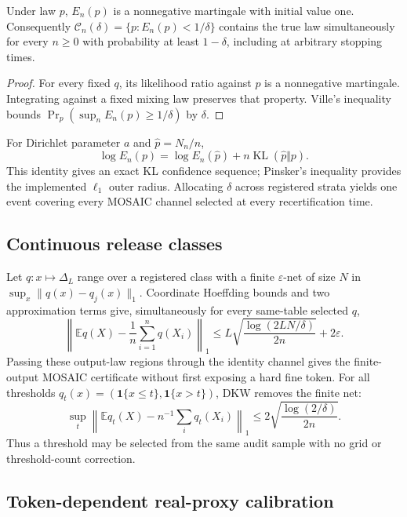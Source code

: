 \begin{theorem}
Under law $p$, $E_n(p)$ is a nonnegative martingale with initial value one.
Consequently
$\mathcal C_n(\delta)=\{p:E_n(p)<1/\delta\}$ contains the true law
simultaneously for every $n\geq0$ with probability at least $1-\delta$,
including at arbitrary stopping times.
\end{theorem}

\begin{proof}
For every fixed $q$, its likelihood ratio against $p$ is a nonnegative
martingale. Integrating against a fixed mixing law preserves that property.
Ville's inequality bounds
$\Pr_p(\sup_n E_n(p)\geq1/\delta)$ by $\delta$.
\end{proof}

For Dirichlet parameter $a$ and $\widehat p=N_n/n$,
\[
\log E_n(p)=\log E_n(\widehat p)+
n\operatorname{KL}(\widehat p\Vert p).
\]
This identity gives an exact KL confidence sequence; Pinsker's inequality
provides the implemented $\ell_1$ outer radius. Allocating $\delta$ across
registered strata yields one event covering every MOSAIC channel selected at
every recertification time.

\subsection{Continuous release classes}

Let $q:x\mapsto\Delta_L$ range over a registered class with a finite
$\varepsilon$-net of size $N$ in
$\sup_x\|q(x)-q_j(x)\|_1$. Coordinate Hoeffding bounds and two approximation
terms give, simultaneously for every same-table selected $q$,
\begin{equation}
\left\|\mathbb E q(X)-\frac1n\sum_{i=1}^nq(X_i)\right\|_1
\leq
L\sqrt{\frac{\log(2LN/\delta)}{2n}}+2\varepsilon.
\label{supp:eq:continuous-cover}
\end{equation}
Passing these output-law regions through the identity channel gives the
finite-output MOSAIC certificate without first exposing a hard fine token.
For all thresholds $q_t(x)=(\mathbf1\{x\leq t\},\mathbf1\{x>t\})$, DKW removes
the finite net:
\[
\sup_t\left\|\mathbb E q_t(X)-n^{-1}\sum_iq_t(X_i)\right\|_1
\leq2\sqrt{\frac{\log(2/\delta)}{2n}}.
\]
Thus a threshold may be selected from the same audit sample with no grid or
threshold-count correction.

\subsection{Token-dependent real-proxy calibration}

